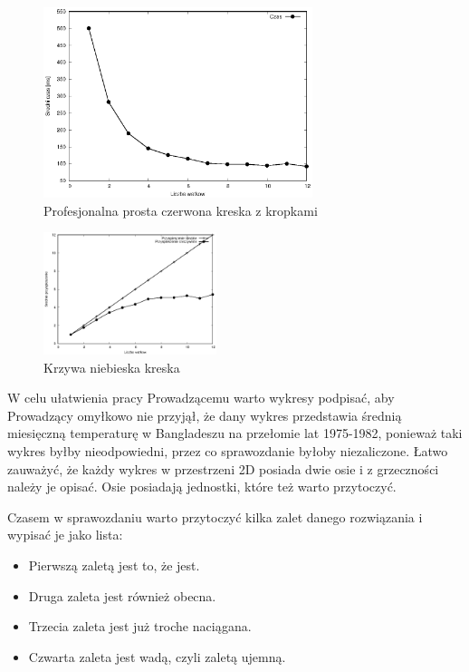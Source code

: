 \documentclass[a4paper,12pt]{article}
\newenvironment{lista}{
\begin{itemize}
  \setlength{\itemsep}{1pt}
  \setlength{\parskip}{0pt}
  \setlength{\parsep}{0pt}
}{\end{itemize}}
\begin{document}
\begin{figure}[!hbp]
	\centering
  \includegraphics[width=0.7\textwidth]{dane/wykresCzas.eps}
  \caption{Profesjonalna prosta czerwona kreska z kropkami}
\end{figure}

\begin{figure}
  \vspace{-20pt}
  \begin{center}
  \includegraphics[width=0.45\textwidth]{dane/wykresPrzyspieszenie.eps}
  \end{center}
  \vspace{-20pt}
  \caption{Krzywa niebieska kreska}
  \vspace{-10pt}
\end{figure}


W celu ułatwienia pracy Prowadzącemu warto wykresy podpisać, aby Prowadzący omyłkowo nie przyjął, że dany wykres przedstawia średnią miesięczną temperaturę w Bangladeszu na przełomie lat 1975-1982, ponieważ taki wykres byłby nieodpowiedni, przez co sprawozdanie byłoby niezaliczone. Łatwo zauważyć, że każdy wykres w przestrzeni 2D posiada dwie osie i z grzeczności należy je opisać. Osie posiadają jednostki, które też warto przytoczyć.

Czasem w sprawozdaniu warto przytoczyć kilka zalet danego rozwiązania i wypisać je jako lista:
\begin{lista}
 \item Pierwszą zaletą jest to, że jest.
 \item Druga zaleta jest również obecna.
 \item Trzecia zaleta jest już troche naciągana.
 \item Czwarta zaleta jest wadą, czyli zaletą ujemną.
\end{lista}
\end{document}
